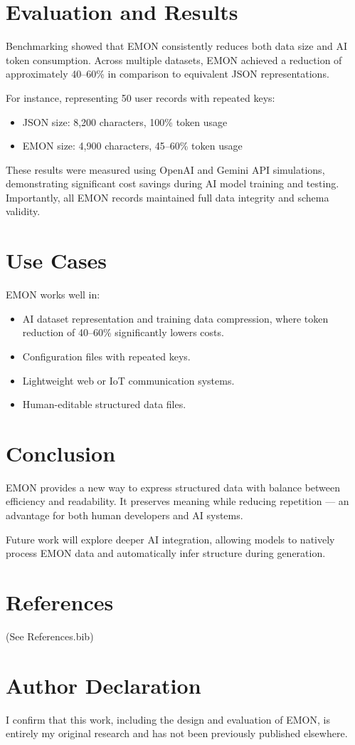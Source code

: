 \documentclass[12pt,a4paper]{article}
\begin{document}
\section{Evaluation and Results}
Benchmarking showed that EMON consistently reduces both data size and AI token consumption. Across multiple datasets, EMON achieved a reduction of approximately 40--60\% in comparison to equivalent JSON representations.

For instance, representing 50 user records with repeated keys:
\begin{itemize}
    \item JSON size: 8,200 characters, 100\% token usage
    \item EMON size: 4,900 characters, 45--60\% token usage
\end{itemize}

These results were measured using OpenAI and Gemini API simulations, demonstrating significant cost savings during AI model training and testing. Importantly, all EMON records maintained full data integrity and schema validity.

\section{Use Cases}
EMON works well in:
\begin{itemize}
    \item AI dataset representation and training data compression, where token reduction of 40--60\% significantly lowers costs.
    \item Configuration files with repeated keys.
    \item Lightweight web or IoT communication systems.
    \item Human-editable structured data files.
\end{itemize}

\section{Conclusion}
EMON provides a new way to express structured data with balance between efficiency and readability. It preserves meaning while reducing repetition --- an advantage for both human developers and AI systems.

Future work will explore deeper AI integration, allowing models to natively process EMON data and automatically infer structure during generation.

\section*{References}
(See References.bib)

\section*{Author Declaration}
I confirm that this work, including the design and evaluation of EMON, is entirely my original research and has not been previously published elsewhere.
\end{document}
